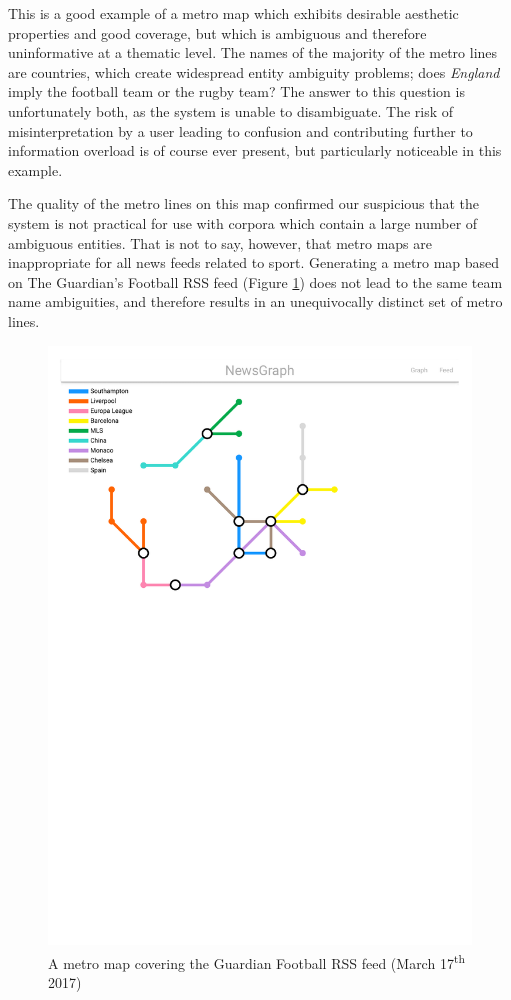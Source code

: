 This is a good example of a metro map which exhibits desirable aesthetic properties and good coverage, but which is ambiguous and therefore uninformative at a thematic level. The names of the majority of the metro lines are countries, which create widespread entity ambiguity problems; does \textit{England} imply the football team or the rugby team? The answer to this question is unfortunately both, as the system is unable to disambiguate. The risk of misinterpretation by a user leading to confusion and contributing further to information overload is of course ever present, but particularly noticeable in this example.

The quality of the metro lines on this map confirmed our suspicious that the system is not practical for use with corpora which contain a large number of ambiguous entities. That is not to say, however, that metro maps are inappropriate for all news feeds related to sport. Generating a metro map based on The Guardian's Football RSS feed (Figure \ref{fig:guardian-football}) does not lead to the same team name ambiguities, and therefore results in an unequivocally distinct set of metro lines.\\

\begin{figure}[htbp!]
	\centering
	\includegraphics[width=\textwidth]{img/results/guardian-football.pdf}
	\caption{A metro map covering the Guardian Football RSS feed (March 17\textsuperscript{th} 2017)}
	\label{fig:guardian-football}
\end{figure}

